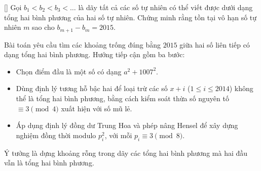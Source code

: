 \documentclass[../09-contruction-methods.tex]{subfiles}
\begin{document}
\begin{example*}\label{example:IRN-2015-TST-D1-P3}[\textbf{}]
    Gọi \( b_1 < b_2 < b_3 < \dots \) là dãy tất cả các số tự nhiên có thể viết được dưới dạng tổng hai bình phương của hai số tự nhiên.
    Chứng minh rằng tồn tại vô hạn số tự nhiên \( m \) sao cho \( b_{m+1} - b_m = 2015 \).
\end{example*}

\begin{story*}
    Bài toán yêu cầu tìm các khoảng trống đúng bằng \( 2015 \) giữa hai số liên tiếp có dạng tổng hai bình phương.
    Hướng tiếp cận gồm ba bước:
    \begin{itemize}[topsep=0pt, partopsep=0pt, itemsep=0pt]
        \item Chọn điểm đầu là một số có dạng \( a^2 + 1007^2 \).
        \item Dùng định lý tương hỗ bậc hai để loại trừ các số \( x + i \) (\(1 \le i \le 2014\)) không thể là tổng hai bình phương, bằng cách kiểm soát thừa số nguyên tố \( \equiv 3 \pmod{4} \) xuất hiện với số mũ lẻ.
        \item Áp dụng định lý đồng dư Trung Hoa và phép nâng Hensel để xây dựng nghiệm đồng thời modulo \( p_i^2 \), với mỗi \( p_i \equiv 3 \pmod{8} \).
    \end{itemize}
    Ý tưởng là dựng khoảng rỗng trong dãy các tổng hai bình phương mà hai đầu vẫn là tổng hai bình phương.
\end{story*}
\end{document}
